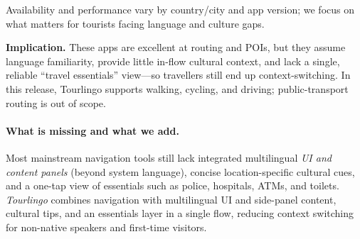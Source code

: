 \begin{sloppypar}
\begin{table}[H]
  \vspace{4pt}
  \footnotesize Availability and performance vary by country/city and app version; we focus on what matters for tourists facing language and culture gaps.
\end{table}

\noindent\textbf{Implication.}
These apps are excellent at routing and POIs, but they assume language familiarity, provide little in-flow cultural context, and lack a single, reliable “travel essentials” view—so travellers still end up context-switching. In this release, Tourlingo supports walking, cycling, and driving; public-transport routing is out of scope.

\paragraph{What is missing and what we add.}
Most mainstream navigation tools still lack integrated multilingual \emph{UI and content panels} (beyond system language), concise location-specific cultural cues, and a one-tap view of essentials such as police, hospitals, ATMs, and toilets. \emph{Tourlingo} combines navigation with multilingual UI and side-panel content, cultural tips, and an essentials layer in a single flow, reducing context switching for non-native speakers and first-time visitors.

\end{sloppypar}

